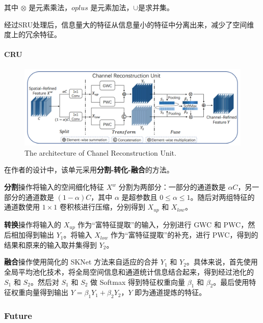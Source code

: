 \documentclass[a4paper]{ctexart}
\begin{document}
	其中 $\otimes$ 是元素乘法，$oplus$ 是元素加法，$\cup$是求并集。
	
	经过SRU处理后，信息量大的特征从信息量小的特征中分离出来，减少了空间维度上的冗余特征。
	
	\paragraph{CRU}
	
	\begin{figure}[htbp]
		\centering 
		\includegraphics[width=\columnwidth]{picture/LLIE/SCConv/Chanel Reconstruction Unit}
		\caption{
			\label{fig: Chanel Reconstruction Unit} 
			The architecture of Chanel Reconstruction Unit.
		}
	\end{figure}
	
	在作者的设计中，该单元采用\textbf{分割-转化-融合}的方法。
	
	\textbf{分割}操作将输入的空间细化特征 $X^{w}$ 分割为两部分：一部分的通道数是 $\alpha C$，另一部分的通道数是 $\left(1-\alpha \right) C$，其中 $\alpha$ 是超参数且 $0 \leq \alpha \leq 1$。随后对两组特征的通道数使用 $1 \times 1$ 卷积核进行压缩，分别得到 $X_{up}$ 和 $X_{low}$。
	
	\textbf{转换}操作将输入的 $X_{up}$ 作为“富特征提取”的输入，分别进行 GWC 和 PWC，然后相加得到输出 $Y_{1}$。将输入 $X_{low}$ 作为“富特征提取”的补充，进行 PWC，得到的结果和原来的输入取并集得到 $Y_2$。
	
	\textbf{融合}操作使用简化的 SKNet 方法来自适应的合并 $Y_{1}$ 和 $Y_{2}$。具体来说，首先使用全局平均池化技术，将全局空间信息和通道统计信息结合起来，得到经过池化的 $S_{1}$ 和 $S_{2}$。然后对 $S_{1}$ 和 $S_{2}$ 做 Softmax 得到特征权重向量 $\beta_{1}$ 和 $\beta_{2}$。最后使用特征权重向量得到输出 $Y=\beta_{1}Y_{1} + \beta_{2}Y_{2}$，$Y$ 即为通道提炼的特征。
	
	\subsubsection{Future}
	
\end{document}
